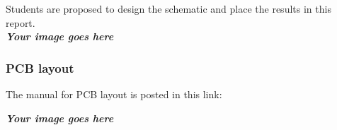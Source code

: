 Students are proposed to design the schematic and place the results in this report.\\

\textbf{\textit{Your image goes here}}

\subsubsection{PCB layout}
The manual for PCB layout is posted in this link:\\

\begin{center}
\end{center}

\textbf{\textit{Your image goes here}}